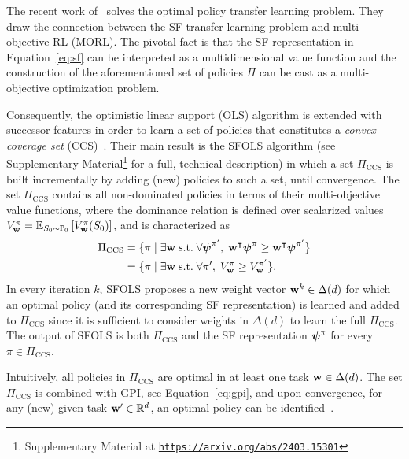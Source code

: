 The recent work of~\citep{Alegre2022} solves the optimal policy transfer learning problem. They draw the connection between the SF transfer learning problem and multi-objective RL (MORL). The pivotal fact is that the SF representation in Equation~\eqref{eq:sf} can be interpreted as a multidimensional value function and the construction of the aforementioned set of policies $\Pi$ can be cast as a multi-objective optimization problem.
 
 Consequently, the optimistic linear support (OLS) algorithm is extended with successor features in order to learn a set of policies that constitutes a \textit{convex coverage set} (CCS)~\citep{Roijers2015}. Their main result is the SFOLS algorithm (see Supplementary Material\footnote{Supplementary Material at {\texttt{\url{https://arxiv.org/abs/2403.15301}}}} for a full, technical description) in which a set $\Pi_\text{CCS}$ is built incrementally by adding (new) policies to such a set, until convergence. The set $\Pi_\text{CCS}$ contains all non-dominated policies in terms of their multi-objective value functions, where the dominance relation is defined over scalarized values ${V^\pi_{\mathbf{w}} = \mathbb{E}_{S_0\sim\mathbb{P}_0}\left[V^\pi_{\mathbf{w}}(S_0)\right]}$, and is characterized as
\begin{align}
  \Pi_\text{CCS} &= \{\pi\;\lvert\;\exists\mathbf{w}\;\text{s.t.}\;\forall {\boldsymbol{\mathbf{\psi}}}^{\pi'},\; \mathbf{w}^\intercal {\boldsymbol{\mathbf{\psi}}}^\pi {\;\geq\;} \mathbf{w}^\intercal{\boldsymbol{\mathbf{\psi}}}^{\pi'} \} \nonumber\\
  &= \{ \pi \;\lvert\;\exists\mathbf{w}\;\text{s.t.}\;\forall {\pi'},\; {V^\pi_{\mathbf{w}}}{\;\geq\;} {V^{\pi'}_{\mathbf{w}}}\}.
\end{align} 
In every iteration $k$, SFOLS proposes a new weight vector $\mathbf{w}^k\in\Delta(d)$ for which an optimal policy (and its corresponding SF representation) is learned and added to $\Pi_\text{CCS}$ since it is sufficient to consider weights in $\Delta(d)$ to learn the full $\Pi_\text{CCS}$. The output of SFOLS is both $\Pi_\text{CCS}$ and the SF representation $\boldsymbol{\mathbf{\psi}}^\pi$ for every $\pi\in\Pi_\text{CCS}$.
 
Intuitively, all policies in $\Pi_\text{CCS}$ are optimal in at least one task $\mathbf{w} \in \Delta(d)$.
The set $\Pi_\text{CCS}$ is combined with GPI, see Equation~\eqref{eq:gpi}, and upon convergence, for any (new) given task $\mathbf{w}'\in\mathbb{R}^d$, an optimal policy can be identified~\citep[cf. Theorem 2]{Alegre2022}.


